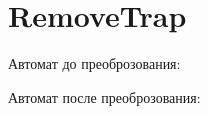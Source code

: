 \section{RemoveTrap}
\begin{frame}{}
	Автомат до преоброзования:


	Автомат после преоброзования:

\end{frame}
